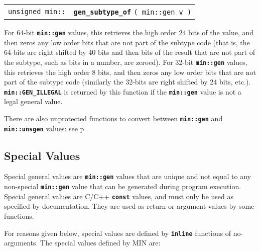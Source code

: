 \documentclass[12pt]{article}
\makeatletter
\newcommand{\TT}[1]{{\tt \bfseries #1}}
\newcommand{\ttindex}[1]{\index{#1@{\tt #1}}}
\newcommand{\minindex}[1]{\ttindex{min::#1}\ttindex{#1}}
\newcommand{\pagref}[1]{p\pageref{#1}}
\newcommand{\EOL}{\penalty \exhyphenpenalty}
\newenvironment{indpar}[1][0.3in]%
	{\begin{list}{}%
		     {\setlength{\itemsep}{0in}%
		      \setlength{\topsep}{0in}%
		      \setlength{\parsep}{1ex}%
		      \setlength{\labelwidth}{#1}%
		      \setlength{\leftmargin}{#1}%
		      \addtolength{\leftmargin}{\labelsep}}%
	 \item}%
	{\end{list}}
\newcommand{\LABEL}[1]{\label{#1}}
\newcommand{\MINKEY}[1]{{\tt \bf #1}\minindex{#1}}
\makeatother
\begin{document}
\begin{indpar}\begin{tabular}{r@{}l}
\verb|unsigned min::| & \MINKEY{gen\_subtype\_of} \verb|( min::gen v )|
\LABEL{MIN::GEN_SUBTYPE_OF} \\
\end{tabular}\end{indpar}

For 64-bit \TT{min::gen} values, this retrieves the high order
24 bits of the value, and then zeros any low order bits that are not
part of the subtype code (that is, the 64-bits are right shifted by
40 bits and then bits of the result that are not part of the
subtype, such as bits in a number, are zeroed).
For 32-bit \TT{min::gen} values, this retrieves
the high order 8 bits, and then zeros any low order bits that are not
part of the subtype code (similarly the 32-bits are right shifted by
24 bits, etc.).
\TT{min::GEN\_ILLEGAL} is returned by this function if the \TT{min::gen}
value is not a legal general value.

There are also unprotected functions to convert between
\TT{min::\EOL gen} and \TT{min::\EOL unsgen} values:
see \pagref{MUP::NEW_GEN}.

\subsection{Special Values}
\label{SPECIAL-VALUES}

Special general values are \TT{min::gen} values that are unique
and not equal to any non-special \TT{min::\EOL gen}
value that can be generated during
program execution.  Special general values are C/C++ \TT{const}
values, and must only be used as specified by documentation.
They are used as return or argument values by some functions.

For reasons given below, special values are defined by \TT{inline}
functions of no-arguments.
The special values defined by MIN are:
\end{document}
